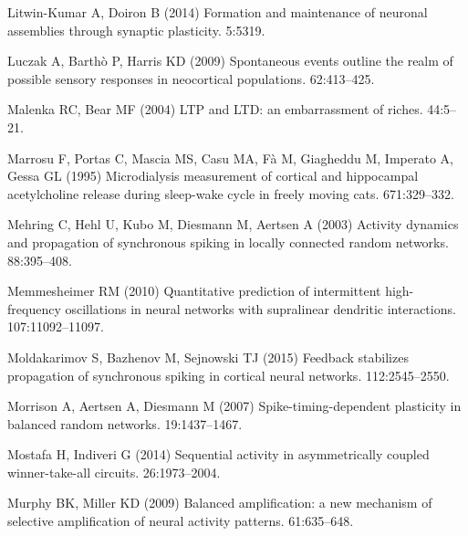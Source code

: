 \begin{thebibliography}{}
Litwin-Kumar A, Doiron B (2014{\rm{}})
\newblock Formation and maintenance of neuronal assemblies through synaptic plasticity.
 5:5319.

  Luczak A, Barth{\`o} P, Harris KD (2009{\rm{}})
\newblock Spontaneous events outline the realm of possible sensory responses in neocortical populations.
 62:413--425.

Malenka RC, Bear MF (2004{\rm{}})
\newblock LTP and LTD: an embarrassment of riches.
 44:5--21.

Marrosu F, Portas C, Mascia MS, Casu MA, F{\`a} M, Giagheddu M, Imperato A, Gessa GL (1995{\rm{}})
\newblock Microdialysis measurement of cortical and hippocampal acetylcholine
  release during sleep-wake cycle in freely moving cats.
 671:329--332.

Mehring C, Hehl U, Kubo M, Diesmann M, Aertsen A (2003{\rm{}})
\newblock Activity dynamics and propagation of synchronous spiking in locally
  connected random networks.
 88:395--408.

Memmesheimer RM (2010{\rm{}})
\newblock Quantitative prediction of intermittent high-frequency oscillations in neural networks with supralinear dendritic interactions.
 107:11092--11097.

Moldakarimov S, Bazhenov M, Sejnowski TJ (2015{\rm{}})
\newblock Feedback stabilizes propagation of synchronous spiking in cortical neural networks.
 112:2545--2550.

Morrison A, Aertsen A, Diesmann M (2007{\rm{}})
\newblock Spike-timing-dependent plasticity in balanced random networks.
 19:1437--1467.

Mostafa H, Indiveri G (2014{\rm{}})
\newblock Sequential activity in asymmetrically coupled winner-take-all circuits.
 26:1973--2004.

Murphy BK, Miller KD (2009{\rm{}})
\newblock Balanced amplification: a new mechanism of selective amplification of
  neural activity patterns.
 61:635--648.


\end{thebibliography}
